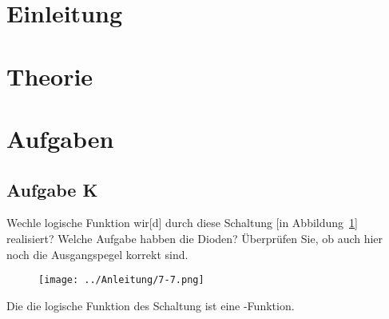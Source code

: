 \tableofcontents
\newpage


\FloatBarrier
\section{Einleitung}


\FloatBarrier
\section{Theorie}


\FloatBarrier
\section{Aufgaben}

\FloatBarrier
\subsection{Aufgabe K}

\begin{problem}
	Wechle logische Funktion wir[d] durch diese Schaltung [in
	Abbildung~\ref{fig:7-7}] realisiert? Welche Aufgabe habben die Dioden?
	Überprüfen Sie, ob auch hier noch die Ausgangspegel korrekt sind.
\end{problem}

\begin{figure}[htbp]
	\centering
	\texttt{[image: ../Anleitung/7-7.png]}
	\caption{%
		\cite[Abbildung~7.7]{physik313-Anleitung}
	}
	\label{fig:7-7}
\end{figure}

Die die logische Funktion des Schaltung ist eine \tnor-Funktion.

